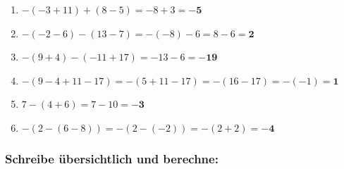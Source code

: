 \documentclass[a4paper,10pt]{article} %
\begin{document}
\begin{enumerate}
  \item \(-(-3 + 11) + (8 - 5) =
    -8 + 3 =
    \mathbf{-5}\) %

  \item \(-(-2 - 6) - (13 - 7) =
    -(-8) - 6 =
    8 - 6 =
    \mathbf{2}\) %

  \item \(-(9 + 4) - (-11 + 17) =
    -13 - 6 =
    \mathbf{-19}\) %

  \item \(-(9 - 4 + 11 - 17) =
    -(5 + 11 - 17) =
    -(16 - 17) =
    -(-1) =
    \mathbf{1}\) %

  \item \(7 - (4 + 6) =
    7 - 10 =
    \mathbf{-3}\) %

  \item \(-(2 - (6 - 8)) =
    -(2 - (-2)) =
    -(2 + 2) =
    \mathbf{-4}\) %

\end{enumerate}

\subsubsection{Schreibe übersichtlich und berechne:} %
\end{document}
